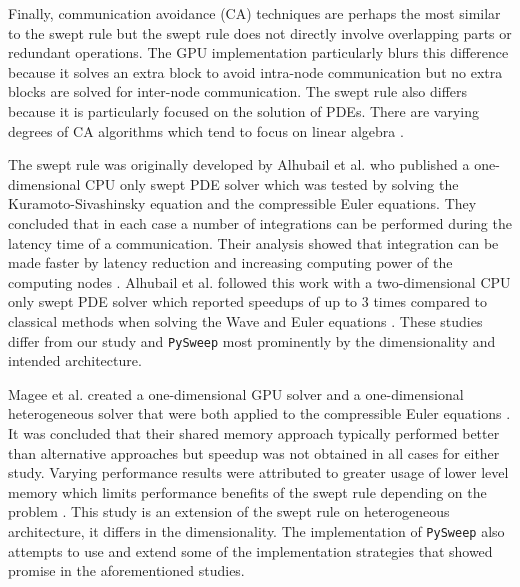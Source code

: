 \documentclass[journal,article,submit,moreauthors,pdftex]{Definitions/mdpi}
\def\pysweep{\texttt{PySweep}}
\begin{document}
\par
 Finally, communication avoidance (CA) techniques are perhaps the most similar to the swept rule but the swept rule does not directly involve overlapping parts or redundant operations. The GPU implementation particularly blurs this difference because it solves an extra block to avoid intra-node communication but no extra blocks are solved for inter-node communication. The swept rule also differs because it is particularly focused on the solution of PDEs. There are varying degrees of CA algorithms which tend to focus on linear algebra \cite{DemmelAvoidingComputations, Ballard2011MinimizingAlgebra,BaboulinAMachines,Khabou2012LUVersion,SolomonikAHoefler}. 

\par
The swept rule was originally developed by Alhubail et al. who published a one-dimensional CPU only swept PDE solver which was tested by solving the Kuramoto-Sivashinsky equation and the compressible Euler equations. They concluded that in each case a number of integrations can be performed during the latency time of a communication. Their analysis showed that integration can be made faster by latency reduction and increasing computing power of the computing nodes \cite{Alhubail2016ThePDEs}. Alhubail et al. followed this work with a two-dimensional CPU only swept PDE solver which reported speedups of up to 3 times compared to classical methods when solving the Wave and Euler equations \cite{Alhubail2018ThePDEs}. These studies differ from our study and \pysweep{} most prominently by the dimensionality and intended architecture.

\par
Magee et al. created a one-dimensional GPU solver and a one-dimensional heterogeneous solver that were both applied to the compressible Euler equations \cite{Magee2018AcceleratingDecomposition,Magee2020ApplyingSystems}. It was concluded that their shared memory approach typically performed better than alternative approaches but speedup was not obtained in all cases for either study. Varying performance results were attributed to greater usage of lower level memory which limits performance benefits of the swept rule depending on the problem \cite{Magee2018AcceleratingDecomposition}. This study is an extension of the swept rule on heterogeneous architecture, it differs in the dimensionality. The implementation of \pysweep{} also attempts to use and extend some of the implementation strategies that showed promise in the aforementioned studies.
\end{document}
